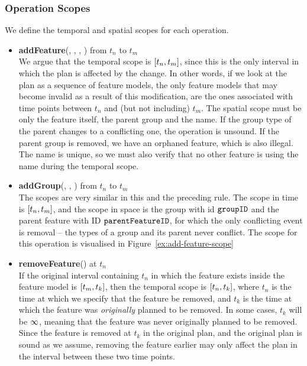 \subsubsection*{Operation Scopes}
We define the temporal and spatial scopes for each operation.
\begin{itemize}

  \item \textbf{addFeature}(, , , ) from $t_n$ to $t_m$\\
     We argue that the temporal scope is $\interval{t_n}{t_m}$, since this is the only interval in which the plan is affected by the change. In other words, if we look at the plan as a sequence of feature models, the only feature models that may become invalid as a result of this modification, are the ones associated with time points between $t_n$ and (but not including) $t_m$. The spatial scope must be only the feature itself, the parent group and the name. If the group type of the parent changes to a conflicting one, the operation is unsound. If the parent group is removed, we have an orphaned feature, which is also illegal. The name is unique, so we must also verify that no other feature is using the name during the temporal scope. 
 

  \item \textbf{addGroup}(, , ) from $t_n$ to $t_m$\\
    The scopes are very similar in this and the preceding rule. The scope in time is $\interval{t_n}{t_m}$, and the scope in space is the group with id $\texttt{groupID}$ and the parent feature with ID $\texttt{parentFeatureID}$, for which the only conflicting event is removal -- the types of a group and its parent never conflict. The scope for this operation is visualised in Figure~\vref{ex:add-feature-scope}
  \item \textbf{removeFeature}() at $t_n$\\
    If the original interval containing $t_n$ in which the feature exists inside the feature model is $\interval{t_m}{t_k}$, then the temporal scope is $\interval{t_n}{t_k}$, where $t_n$ is the time at which we specify that the feature be removed, and $t_k$ is the time at which the feature was \emph{originally} planned to be removed. In some cases, $t_k$ will be $\infty$, meaning that the feature was never originally planned to be removed. Since the feature is removed at $t_k$ in the original plan, and the original plan is sound as we assume, removing the feature earlier may only affect the plan in the interval between these two time points.


\end{itemize}
